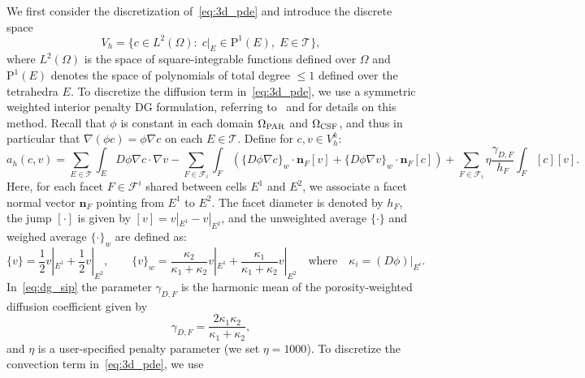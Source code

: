 \documentclass[fleqn,10pt]{wlscirep}
\begin{document}
We first consider the discretization of~\eqref{eq:3d_pde} and
introduce the discrete space
\begin{equation}
  V_h = \{c \in L^2(\Omega): \;  c \vert_E \in \mathrm{P}^1(E), \; E \in \mathcal{T}\} ,
\end{equation}
where $L^2(\Omega)$ is the space of square-integrable functions
defined over $\Omega$ and $\mathrm{P}^1(E)$ denotes the space of
polynomials of total degree $\leqslant 1$ defined over the tetrahedra
$E$. To discretize the diffusion term in~\eqref{eq:3d_pde}, we use a
symmetric weighted interior penalty DG formulation, referring
to~\cite{ern2009discontinuous} and \cite[Section
  4.5.2.3]{di2011mathematical} for details on this
method. Recall that $\phi$ is constant in each domain
  $\Omega_{\rm PAR}$ and $\Omega_{\rm CSF}$, and thus in particular
  that $\nabla (\phi c) = \phi \nabla c$ on each $E \in \mathcal{T}$.
Define for $c, v \in V_h^k$:
\begin{equation}
  a_h (c, v)
  =
  \sum_{E \in \mathcal{T}} \int_{E} D\phi \nabla c \cdot \nabla v
  - \sum_{F \in \mathcal{F}_i} \int_{F} \left( \{D \phi \nabla c \}_w \cdot \mathbf{n}_F [v]
  + \{D \phi \nabla v \}_w \cdot \mathbf{n}_F [c] \right) 
   + \sum_{F \in \mathcal{F}_i} \eta \frac{\gamma_{D,F}}{h_F} \int_{F} [c][v] 
  .
  \label{eq:dg_sip}
\end{equation}
Here, for each facet $F \in \mathcal{F}^i$ shared
between cells $E^1$ and $E^2$, we associate a  facet normal vector $\mathbf{n}_F$
pointing from $E^1$ to $E^2$. The facet diameter is denoted by $h_F$,
the jump $[\cdot]$ is given by $[v] = v|_{E^1} - v|_{E^2}$, and the
unweighted average $\{ \cdot \}$ and weighed average $\{ \cdot \}_w$
are defined as:
\begin{equation}
  \{v\} = \frac12 v |_{E^1} + \frac12 v |_{E^2}, \qquad
  \{v\}_{w} = \frac{\kappa_2}{\kappa_1 + \kappa_2} v |_{E^1} + \frac{\kappa_1}{\kappa_1 + \kappa_2} v |_{E^2}
  \quad \text{where} \quad \kappa_i = (D \phi) |_{E^i}.  
\end{equation}
In~\eqref{eq:dg_sip} the parameter $\gamma_{D,F}$ is the harmonic mean of the
porosity-weighted diffusion coefficient given by
\begin{equation}
  \gamma_{D,F} = \frac{2\kappa_1\kappa_2}{\kappa_1 + \kappa_2},
\end{equation}
and $\eta$ is a user-specified penalty parameter (we set $\eta=1000$). To discretize the convection term in~\eqref{eq:3d_pde}, we use
\end{document}
